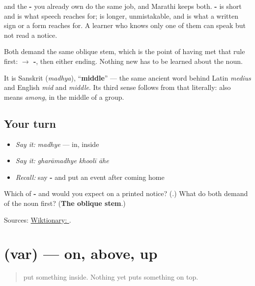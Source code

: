 \textbf{} and the \textbf{-} you already own do the same job, and Marathi keeps both. \textbf{-} is short and is what speech reaches for; \textbf{} is longer, unmistakable, and is what a written sign or a form reaches for. A learner who knows only one of them can speak but not read a notice.

Both demand the same oblique stem, which is the point of having met that rule first: \textbf{ $\to$ -}, then either ending. Nothing new has to be learned about the noun.

It is Sanskrit \textbf{} (\emph{madhya}), \textquotedblleft{}\textbf{middle}\textquotedblright{} — the same ancient word behind Latin \emph{medius} and English \emph{mid} and \emph{middle}. Its third sense follows from that literally: \textbf{} also means \emph{among}, in the middle of a group.

\subsection*{Your turn}
\begin{itemize}
\raggedright
  \item \emph{Say it:} \emph{madhye} — in, inside
  \item \emph{Say it:} \emph{gharāmadhye khoolī āhe}
  \item \emph{Recall:} say \textbf{-} and put an event after coming home
\end{itemize}

\begin{tcolorbox}[breakable,colback=teal!4,colframe=teal!35!black,title={Before you move on}]
Which of \textbf{-} and \textbf{} would you expect on a printed notice? (\textbf{}.) What do both demand of the noun first? (\textbf{The oblique stem}.)

Sources: \href{https://en.wiktionary.org/wiki/\%E0\%A4\%AE\%E0\%A4\%A7\%E0\%A5\%8D\%E0\%A4\%AF\%E0\%A5\%87}{Wiktionary: }.
\end{tcolorbox}
\section[\texorpdfstring{\mr{वर} (var)}{वर (var)}]{ (var) — on, above, up}

\label{lesson:MR-C42-var}



\begin{quote}
\textbf{} put something inside. Nothing yet puts something on top.
\end{quote}

